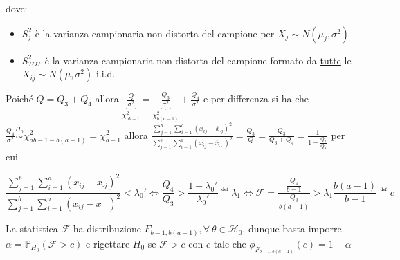 \documentclass[hidelinks, 10pt]{report}
\begin{document}
dove:
\begin{itemize}
\item $ S_{j}^{2} $ \`e la varianza campionaria non distorta del campione per $ X_{j} \sim N(\mu_{j}, \sigma^{2}) $
\item $ S_{TOT}^{2} $ \`e la varianza campionaria non distorta del campione formato da \underline{tutte} le $ X_{ij} \sim N(\mu, \sigma^{2}) $ i.i.d.
\end{itemize}

Poich\'e $ Q = Q_{3} + Q_{4} $ allora $ \underbrace{\frac{Q}{\sigma^{2}}}_{\chi^{2}_{ab - 1}} = \underbrace{\frac{Q_{3}}{\sigma^{2}}}_{\chi^{2}_{b(a - 1)}} + \frac{Q_{4}}{\sigma^{2}} $ e per differenza si ha che $ \frac{Q_{4}}{\sigma^{2}} \stackrel{H_{0}}{\sim} \chi^{2}_{ab - 1 - b(a - 1)} = \chi^{2}_{b - 1} $ allora $ \frac{\sum\limits_{j = 1}^{b} \sum\limits_{i = 1}^{a} (x_{ij} - \overline{x}_{\cdot j})^{2}}{\sum\limits_{j = 1}^{b} \sum\limits_{i = 1}^{a} (x_{ij} - \overline{x}_{\cdot \cdot})^{2}} = \frac{Q_{3}}{Q} = \frac{Q_{3}}{Q_{3} + Q_{4}} = \frac{1}{1 + \frac{Q_{4}}{Q_{3}}} $ per cui 

\[ \frac{\sum\limits_{j = 1}^{b} \sum\limits_{i = 1}^{a} (x_{ij} - \overline{x}_{\cdot j})^{2}}{\sum\limits_{j = 1}^{b} \sum\limits_{i = 1}^{a} (x_{ij} - \overline{x}_{\cdot \cdot})^{2}} < \lambda_{0}' \iff \frac{Q_{4}}{Q_{3}} > \frac{1 - \lambda_{0}'}{\lambda_{0}'} \eqdef \lambda_{1} \iff \mathcal{F} = \frac{\frac{Q_{4}}{b - 1}}{\frac{Q_{3}}{b(a - 1)}} > \lambda_{1} \frac{b(a - 1)}{b - 1} \eqdef c \]

La statistica $ \mathcal{F} $ ha distribuzione $ F_{b - 1, b(a - 1)}, \forall\ \underline{\theta} \in \mathcal{H}_{0} $, dunque basta imporre $ \alpha = \mathbb{P}_{H_{0}} (\mathcal{F} > c) $ e rigettare $ H_{0} $ se $ \mathcal{F} > c $ con $ c $ tale che $ \phi_{F_{b - 1, b(a - 1)}} (c) = 1 - \alpha $

\begin{figure}[H]
\end{figure}
\end{document}
